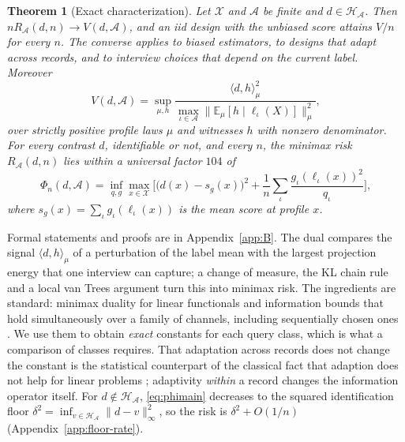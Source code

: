 \documentclass{article}
\newtheorem{theorem}{Theorem}
\newcommand{\E}{\mathbb{E}}
\newcommand{\X}{\mathcal X}
\newcommand{\A}{\mathcal A}
\newcommand{\Hh}{\mathcal H}
\begin{document}
\begin{theorem}[Exact characterization]\label{thm:char}
Let $\X$ and $\A$ be finite and $d\in\Hh_\A$. Then $nR_\A(d,n)\to V(d,\A)$, and an iid design with the unbiased score attains $V/n$ for every $n$. The converse applies to biased estimators, to designs that adapt across records, and to interview choices that depend on the current label. Moreover
\[
 V(d,\A)=\sup_{\mu,h}\frac{\langle d,h\rangle_\mu^2}{\max_{\iota\in\A}\|\E_\mu[h\mid\ell_\iota(X)]\|_\mu^2},
\]
over strictly positive profile laws $\mu$ and witnesses $h$ with nonzero denominator. For every contrast $d$, identifiable or not, and every $n$, the minimax risk $R_\A(d,n)$ lies within a universal factor $104$ of
\begin{equation}
 \Phi_n(d,\A)=\inf_{q,g}\max_{x\in\X}\Big[\big(d(x)-s_g(x)\big)^2+\frac1n\sum_\iota\frac{g_\iota(\ell_\iota(x))^2}{q_\iota}\Big],\!\!\label{eq:phimain}
\end{equation}
where $s_g(x)=\sum_\iota g_\iota(\ell_\iota(x))$ is the mean score at profile $x$.
\end{theorem}
Formal statements and proofs are in Appendix~\ref{app:B}. The dual compares the signal $\langle d,h\rangle_\mu$ of a perturbation of the label mean with the largest projection energy that one interview can capture; a change of measure, the KL chain rule and a local van Trees argument turn this into minimax risk. The ingredients are standard: minimax duality for linear functionals \citep{donoho1994,juditsky2009,polyanskiy2026} and information bounds that hold simultaneously over a family of channels, including sequentially chosen ones \citep{acharya2019,barnes2020}. We use them to obtain \emph{exact} constants for each query class, which is what a comparison of classes requires. That adaptation across records does not change the constant is the statistical counterpart of the classical fact that adaption does not help for linear problems \citep{bakhvalov1971,novak1996}; adaptivity \emph{within} a record changes the information operator itself. For $d\notin\Hh_\A$, \eqref{eq:phimain} decreases to the squared identification floor $\delta^2=\inf_{v\in\Hh_\A}\|d-v\|_\infty^2$, so the risk is $\delta^2+O(1/n)$ (Appendix~\ref{app:floor-rate}).
\end{document}
